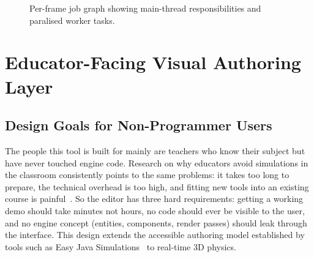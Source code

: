 \documentclass[9pt,openany]{extbook}
\begin{document}
\begin{figure}[H]
\centering
{}
\caption{Per-frame job graph showing main-thread responsibilities and
         paralised worker tasks.}
\label{fig:job_graph}
\end{figure}

\chapter{Educator-Facing Visual Authoring Layer}

\section{Design Goals for Non-Programmer Users}

The people this tool is built for mainly are teachers who know their subject but have never touched engine code. Research on why educators avoid simulations in the classroom consistently points to the same problems: it takes too long to prepare, the technical overhead is too high, and fitting new tools into an existing course is painful~\cite{an2016games,kaimara2021dgbla}. So the editor has three hard requirements: getting a working demo should take minutes not hours, no code should ever be visible to the user, and no engine concept (entities, components, render passes) should leak through the interface. This design extends the accessible authoring model established by tools such as Easy Java Simulations~\cite{esquembre2004ejs} to real-time 3D physics.
\end{document}
